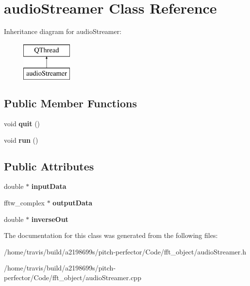 \hypertarget{classaudioStreamer}{\section{audio\-Streamer Class Reference}
\label{classaudioStreamer}
}
Inheritance diagram for audio\-Streamer\-:\begin{figure}[H]
\begin{center}
\leavevmode
\includegraphics[height=2.000000cm]{classaudioStreamer}
\end{center}
\end{figure}
\subsection*{Public Member Functions}
\begin{DoxyCompactItemize}
\item 
\hypertarget{classaudioStreamer_aa236fda0774b738734c2c62b92a912c3}{void {\bfseries quit} ()}\label{classaudioStreamer_aa236fda0774b738734c2c62b92a912c3}

\item 
\hypertarget{classaudioStreamer_a7488bec15fe99d666b66dd5fa45df74e}{void {\bfseries run} ()}\label{classaudioStreamer_a7488bec15fe99d666b66dd5fa45df74e}

\end{DoxyCompactItemize}
\subsection*{Public Attributes}
\begin{DoxyCompactItemize}
\item 
\hypertarget{classaudioStreamer_a86d950b9bf7cebbd955b2f70a28133a0}{double $\ast$ {\bfseries input\-Data}}\label{classaudioStreamer_a86d950b9bf7cebbd955b2f70a28133a0}

\item 
\hypertarget{classaudioStreamer_abbf74a17a02dba11130897c10cf661db}{fftw\-\_\-complex $\ast$ {\bfseries output\-Data}}\label{classaudioStreamer_abbf74a17a02dba11130897c10cf661db}

\item 
\hypertarget{classaudioStreamer_aa78f221b974bfe365bb430e26c951777}{double $\ast$ {\bfseries inverse\-Out}}\label{classaudioStreamer_aa78f221b974bfe365bb430e26c951777}

\end{DoxyCompactItemize}


The documentation for this class was generated from the following files\-:\begin{DoxyCompactItemize}
\item 
/home/travis/build/a2198699s/pitch-\/perfector/\-Code/fft\-\_\-object/audio\-Streamer.\-h\item 
/home/travis/build/a2198699s/pitch-\/perfector/\-Code/fft\-\_\-object/audio\-Streamer.\-cpp\end{DoxyCompactItemize}
